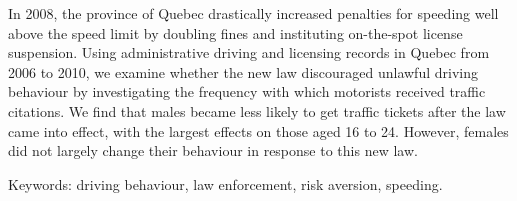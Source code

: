 

In 2008, the province of Quebec drastically increased penalties for speeding 
well above the speed limit by doubling fines and instituting on-the-spot license suspension. 
Using administrative driving and licensing records in Quebec from 2006 to 2010, 
we examine whether the new law discouraged unlawful driving behaviour 
by investigating the frequency with which motorists received traffic citations. 
We find that males became less likely to get traffic tickets after the law came into effect, 
with the largest effects on those aged 16 to 24. 
However, females did not largely change their behaviour in response to this new law. 

\medskip
\noindent
Keywords: driving behaviour, law enforcement, risk aversion, speeding.

